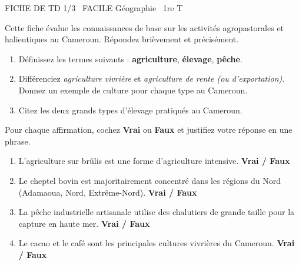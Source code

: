 \documentclass[11pt]{article}
\begin{document}
\begin{tcolorbox}[enhanced,colback=popink,colframe=popink,arc=10pt,boxrule=0pt,left=12pt,right=12pt,top=9pt,bottom=9pt]
{\color{white}\popxbold\small FICHE DE TD 1/3 \textbullet\ FACILE \hfill Géographie \textbullet\ 1re T\par}
\end{tcolorbox}
\vspace{4pt}
Cette fiche évalue les connaissances de base sur les activités agropastorales et halieutiques au Cameroun. Répondez brièvement et précisément.

\begin{exercice}
\begin{enumerate}
    \item Définissez les termes suivants : \textbf{agriculture}, \textbf{élevage}, \textbf{pêche}.
    \item Différenciez \textit{agriculture vivrière} et \textit{agriculture de rente (ou d'exportation)}. Donnez un exemple de culture pour chaque type au Cameroun.
    \item Citez les deux grands types d'élevage pratiqués au Cameroun.
\end{enumerate}
\end{exercice}

\begin{exercice}
Pour chaque affirmation, cochez \textbf{Vrai} ou \textbf{Faux} et justifiez votre réponse en une phrase.
\begin{enumerate}
    \item L'agriculture sur brûlis est une forme d'agriculture intensive. \hfill \textbf{Vrai / Faux}
    \item Le cheptel bovin est majoritairement concentré dans les régions du Nord (Adamaoua, Nord, Extrême-Nord). \hfill \textbf{Vrai / Faux}
    \item La pêche industrielle artisanale utilise des chalutiers de grande taille pour la capture en haute mer. \hfill \textbf{Vrai / Faux}
    \item Le cacao et le café sont les principales cultures vivrières du Cameroun. \hfill \textbf{Vrai / Faux}
\end{enumerate}
\end{exercice}
\end{document}
